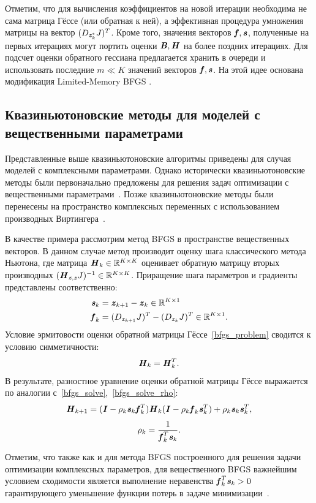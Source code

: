 Отметим, что для вычисления коэффициентов на новой итерации необходима не сама матрица Гёссе (или обратная к ней), а эффективная процедура умножения матрицы на вектор $(D_{\textbf{\textit{z}}^*_{k}}J)^T$. Кроме того, значения векторов $\textbf{\textit{f}}, \textbf{\textit{s}}$, полученные на первых итерациях могут портить оценки $\textbf{\textit{B}}, \textbf{\textit{H}}$ на более поздних итерациях. Для подсчет оценки обратного гессиана предлагается хранить в очереди и использовать последние $m\ll K$ значений векторов $\textbf{\textit{f}}, \textbf{\textit{s}}$. На этой идее основана модификация Limited-Memory BFGS \cite{lbfgs}.

\subsection{Квазиньютоновские методы для моделей с вещественными параметрами} \label{subsec:quasi_newton_real}

Представленные выше квазиньютоновские алгоритмы приведены для случая моделей с комплексными параметрами. Однако исторически квазиньютоновские методы были первоначально предложены для решения задач оптимизации с вещественными параметрами~\cite{davidon1959variable}. Позже квазиньютоновские методы были перенесены на пространство комплексных переменных с использованием производных Виртингера~\cite{sorber2012unconstrained}.

В качестве примера рассмотрим метод BFGS в пространстве вещественных векторов. В данном случае метод производит оценку шага классического метода Ньютона, где матрица $\textbf{\textit{H}}_k\in\mathbb{R}^{K\times K}$ оценивает обратную матрицу вторых производных $(\textbf{\textit{H}}_{\textbf{\textit{z}}, \textbf{\textit{z}}}J)^{-1}\in\mathbb{R}^{K\times K}$. Приращение шага параметров и градиенты представлены соответственно:
\begin{align}
	\textbf{\textit{s}}_k&=\textbf{\textit{z}}_{k+1}-\textbf{\textit{z}}_k\in\mathbb{R}^{K\times1} \nonumber \\
	\textbf{\textit{f}}_{k}&=(D_{\textbf{\textit{z}}_{k+1}}J)^T-(D_{\textbf{\textit{z}}_{k}}J)^T\in\mathbb{R}^{K\times1}. \nonumber
\end{align}
Условие эрмитовости оценки обратной матрицы Гёссе~\eqref{bfgs_problem} сводится к условию симметичности:
\begin{equation}
	\textbf{\textit{H}}_{k}=\textbf{\textit{H}}_{k}^T.
	\label{hess_invers_estim_symmetr}
\end{equation}
В результате, разностное уравнение оценки обратной матрицы Гёссе выражается по аналогии с~\eqref{bfgs_solve},~\eqref{bfgs_solve_rho}:
\begin{equation}
	\textbf{\textit{H}}_{k+1}=(\textbf{\textit{I}}-\rho_{k}\textbf{\textit{s}}_{k}\textbf{\textit{f}}_{k}^T)
	\textbf{\textit{H}}_{k}(\textbf{\textit{I}}-\rho_{k}\textbf{\textit{f}}_{k}\textbf{\textit{s}}_{k}^T)+\rho_{k}\textbf{\textit{s}}_{k}\textbf{\textit{s}}_{k}^T,
	\label{bfgs_solve_real}
\end{equation}
\begin{equation}
	\rho_{k}=\frac{1}{\textbf{\textit{f}}_{k}^T\textbf{\textit{s}}_{k}}.
	\label{bfgs_solve_rho_real}
\end{equation}

Отметим, что также как и для метода BFGS построенного для решения задачи оптимизации комплексных параметров, для вещественного BFGS важнейшим условием сходимости является выполнение неравенства $\textbf{\textit{f}}_{k}^T\textbf{\textit{s}}_{k}>0$ гарантирующего уменьшение функции потерь в задаче минимизации~\cite{pract_optimiz}.